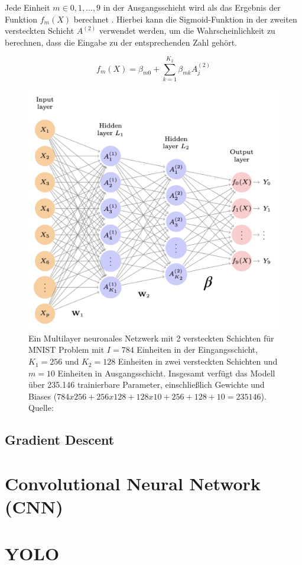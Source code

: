     Jede Einheit $m \in {0, 1, ..., 9}$ in der Ausgangsschicht wird als das Ergebnis der Funktion $f_m(X)$ berechnet \cite{introAI}. Hierbei kann die Sigmoid-Funktion in der zweiten versteckten Schicht $A^{(2)}$ verwendet werden, um die Wahrscheinlichkeit zu berechnen, dass die Eingabe zu der entsprechenden Zahl gehört.

    \begin{equation}
        f_m(X) = \beta_{m0} + \sum_{k = 1}^{K_2} \beta_{mk} A_j^{(2)} 
    \label{eq:background:Layer2}
    \end{equation}

    \begin{figure}[htbp]
        \centering
        \includegraphics[width=0.6\linewidth]{gfx/NeuralNet/MultiLayer.png}
        \caption[Multilayer neuronales Netzwerk]{Ein Multilayer neuronales Netzwerk mit 2 versteckten Schichten für MNIST Problem mit $I = 784$ Einheiten in der Eingangsschicht, $K_1 = 256$ und $K_2 = 128$ Einheiten in zwei versteckten Schichten und $m = 10$ Einheiten in Ausgangsschicht. Insgesamt verfügt das Modell über 235.146 trainierbare Parameter, einschließlich Gewichte und Biases ($784 x 256 + 256 x 128 + 128 x 10 + 256 + 128 + 10 = 235146$). Quelle: \cite{introAI}}
        \label{fig:background:MultilayerNeuronalesNetwerk}
    \end{figure}

    \subsection{Gradient Descent}
\section{Convolutional Neural Network (CNN)}

\section{YOLO}
